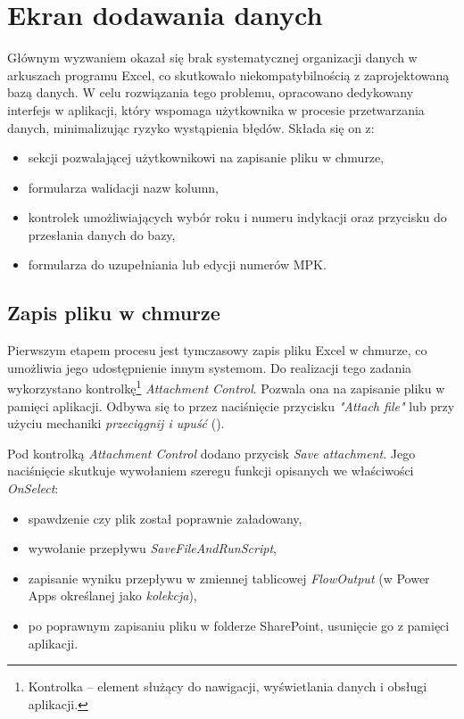 \section{Ekran dodawania danych}

Głównym wyzwaniem okazał się brak systematycznej organizacji danych w arkuszach programu
Excel, co skutkowało niekompatybilnością z zaprojektowaną bazą danych. W celu rozwiązania tego
problemu, opracowano dedykowany interfejs w aplikacji, który wspomaga użytkownika w procesie
przetwarzania danych, minimalizując ryzyko wystąpienia błędów. Składa się on z:
\begin{itemize}
    \item sekcji pozwalającej użytkownikowi na zapisanie pliku w chmurze,
    \item formularza walidacji nazw kolumn,
    \item kontrolek umożliwiających wybór roku i numeru indykacji oraz przycisku do przesłania danych do bazy,
    \item formularza do uzupełniania lub edycji numerów MPK.
\end{itemize}


\subsection{Zapis pliku w chmurze}
Pierwszym etapem procesu jest tymczasowy zapis pliku Excel w chmurze, co umożliwia jego udostępnienie innym systemom. Do realizacji tego zadania wykorzystano kontrolkę\footnote{Kontrolka -- element służący do nawigacji, wyświetlania danych i obsługi aplikacji.} \emph{Attachment Control}. Pozwala ona na zapisanie pliku w pamięci aplikacji. Odbywa się to przez naciśnięcie przycisku \emph{"Attach file"} lub przy użyciu mechaniki \emph{przeciągnij i upuść} ().

Pod kontrolką \emph{Attachment Control} dodano przycisk \emph{Save attachment}. Jego naciśnięcie skutkuje wywołaniem szeregu funkcji opisanych we właściwości \emph{OnSelect}:
\begin{itemize}
    \item spawdzenie czy plik został poprawnie załadowany,
    \item wywołanie przepływu \emph{SaveFileAndRunScript},
    \item zapisanie wyniku przepływu w zmiennej tablicowej \emph{FlowOutput} (w Power Apps określanej jako \emph{kolekcja}),
    \item po poprawnym zapisaniu pliku w folderze SharePoint, usunięcie go z pamięci aplikacji.
\end{itemize}

